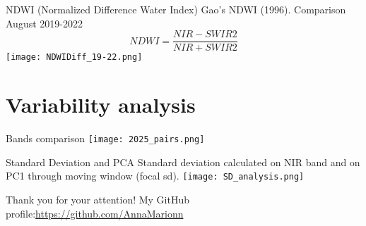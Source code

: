 \documentclass{beamer}
\begin{document}
\begin{frame}{NDWI (Normalized Difference Water Index) }
     \centering
     Gao's NDWI (1996). Comparison August 2019-2022
     \begin{equation}
        NDWI = \frac{NIR - SWIR2}{NIR +SWIR2}
     \end{equation}
    \texttt{[image: NDWIDiff\_19-22.png]}
\end{frame}

\section{Variability analysis}


\begin{frame}{Bands comparison}
     \centering
    \texttt{[image: 2025\_pairs.png]}
\end{frame}


\begin{frame}{Standard Deviation and PCA}
    \centering
    Standard deviation calculated on NIR band and on PC1 through moving window (focal sd).
    \texttt{[image: SD\_analysis.png]} 
\end{frame}

\begin{frame}{Thank you for your attention!
 My GitHub profile:\url{https://github.com/AnnaMarionn}
     \centering}
    
\end{frame}
\end{document}
